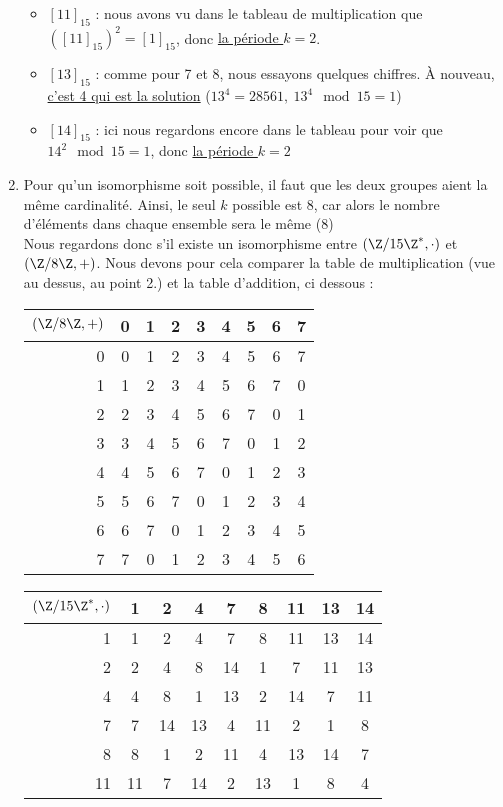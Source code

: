 \documentclass[10p,a4paper]{scrartcl}
\begin{document}
\begin{enumerate}
\begin{itemize}
				\item	$[11]_{15}$ : nous avons vu dans le tableau de multiplication que $([11]_{15})^2 = [1]_{15}$, donc \uline{la période $k = 2$}.	
				\item	$[13]_{15}$ : comme pour 7 et 8, nous essayons quelques chiffres. À nouveau, \uline{c'est 4 qui est la solution} ($13^4 = 28561,\ 13^4 \mod 15 = 1$)
				\item	$[14]_{15}$ : ici nous regardons encore dans le tableau pour voir que $14^2 \mod 15 = 1$, donc \uline{la période $k = 2$}
			\end{itemize}
	\item	Pour qu'un isomorphisme soit possible, il faut que  les deux groupes aient la même cardinalité. Ainsi, le seul $k$ possible est 8, car alors le nombre d'éléments dans chaque ensemble sera le même (8)\\
			Nous regardons donc s'il existe un isomorphisme entre $(\Z/15\Z^*,\cdot)$ et $(\Z/8\Z,+)$. Nous devons pour cela comparer la table de multiplication (vue au dessus, au point 2.) et la table d'addition, ci dessous :\\
			\begin{tabular}{r|cccccccc}
				$(\Z/8\Z,+)$ & 0 & 1 & 2 & 3 & 4 & 5 & 6 & 7	\\			
				\hline
				0 & 0 & 1 & 2 & 3 & 4 & 5 & 6 & 7\\
				1 & 1 & 2 & 3 & 4 & 5 & 6 & 7 & 0\\
				2 & 2 & 3 & 4 & 5 & 6 & 7 & 0 & 1\\
				3 & 3 & 4 & 5 & 6 & 7 & 0 & 1 & 2\\
				4 & 4 & 5 & 6 & 7 & 0 & 1 & 2 & 3\\
				5 & 5 & 6 & 7 & 0 & 1 & 2 & 3 & 4\\
				6 & 6 & 7 & 0 & 1 & 2 & 3 & 4 & 5\\
				7 & 7 & 0 & 1 & 2 & 3 & 4 & 5 & 6
			\end{tabular}
			\begin{tabular}{r|cccccccc}
				$(\Z/15\Z^*,\cdot)$ & 1 & 2 & 4 & 7 & 8 & 11 & 13 & 14	\\			
				\hline
				1 & 1 & 2 & 4 & 7 & 8 & 11 & 13 & 14\\
				2 & 2 & 4 & 8 & 14 & 1 & 7 & 11 & 13\\
				4 & 4 & 8 & 1 & 13 & 2 & 14 & 7 & 11\\
				7 & 7 & 14 & 13 & 4 & 11 & 2 & 1 & 8\\
				8 & 8 & 1 & 2 & 11 & 4 & 13 & 14 & 7\\
				11 & 11 & 7 & 14 & 2 & 13 & 1 & 8 & 4\\

\end{tabular}
\end{enumerate}
\end{document}
